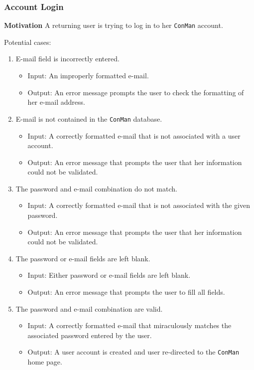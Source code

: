 \documentclass{article}
\begin{document}
\subsubsection{Account Login}
\textbf{Motivation} A returning user is trying to log in to her \texttt{ConMan} account.

Potential cases:
\begin{enumerate}
    \item E-mail field is incorrectly entered.
        \begin{itemize}
            \item Input: An improperly formatted e-mail.
            \item Output: An error message prompts the user to check the
formatting of her e-mail address.
        \end{itemize}
    \item E-mail is not contained in the \texttt{ConMan} database.
        \begin{itemize}
            \item Input: A correctly formatted e-mail that is not associated
with a user account.
            \item Output: An error message that prompts the user that her
information could not be validated.
        \end{itemize}
    \item The password and e-mail combination do not match.
        \begin{itemize}
            \item Input: A correctly formatted e-mail that is not associated
with the given password.
            \item Output: An error message that prompts the user that her
information could not be validated.
        \end{itemize}
    \item The password or e-mail fields are left blank.
        \begin{itemize}
            \item Input: Either password or e-mail fields are left blank.
            \item Output: An error message that prompts the user to fill all
fields.
        \end{itemize}
    \item The password and e-mail combination are valid.
        \begin{itemize}
            \item Input: A correctly formatted e-mail that miraculously
matches the associated password entered by the user.
            \item Output: A user account is created and user re-directed to
the \texttt{ConMan} home page.
        \end{itemize}
\end{enumerate}
\end{document}
